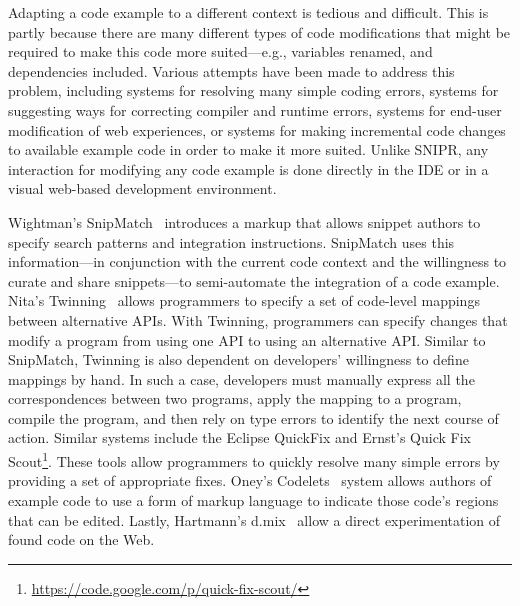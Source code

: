 Adapting a code example to a different context is tedious and difficult. This is partly because there are many different types of code modifications that might be required to make this code more suited---e.g., variables renamed, and dependencies included. Various attempts have been made to address this problem, including systems for resolving many simple coding errors, systems for suggesting ways for correcting compiler and runtime errors, systems for end-user modification of web experiences, or systems for making incremental code changes to available example code in order to make it more suited. Unlike \uppercase{SnipR}, any interaction for modifying any code example is done directly in the IDE or in a visual web-based development environment.  

Wightman's SnipMatch~\cite{Wightman:2012gc} introduces a markup that allows snippet authors to specify search patterns and integration instructions. SnipMatch uses this information---in conjunction with the current code context and the willingness to curate and share snippets---to semi-automate the integration of a code example. Nita's Twinning~\cite{Nita:2010en} allows programmers to specify a set of code-level mappings between alternative APIs. With Twinning, programmers can specify changes that modify a program from using one API to using an alternative API. Similar to SnipMatch, Twinning is also dependent on developers' willingness to define mappings by hand. In such a case, developers must manually express all the correspondences between two programs, apply the mapping to a program, compile the program, and then rely on type errors to identify the next course of action.  Similar systems include the Eclipse QuickFix and Ernst's Quick Fix Scout\footnote{\url{https://code.google.com/p/quick-fix-scout/}}. These tools allow programmers to quickly resolve many simple errors by providing a set of appropriate fixes. Oney's Codelets~\cite{Oney:2012ge} system allows authors of example code to use a form of markup language to indicate those code's regions that can be edited. Lastly, Hartmann's d.mix~\cite{Hartmann:2007wf} allow a direct experimentation of found code on the Web.

